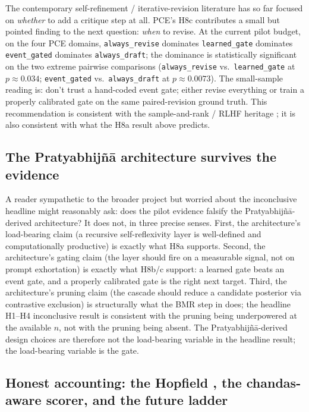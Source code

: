 The contemporary self-refinement / iterative-revision literature \citep{MadaanEtAl2023SelfRefineNeurIPS,ShinnEtAl2023Reflexion,BaiEtAl2022ConstitutionalAI} has so far focused on \emph{whether} to add a critique step at all. PCE's H8c contributes a small but pointed finding to the next question: \emph{when} to revise. At the current pilot budget, on the four PCE domains, \texttt{always\_revise} dominates \texttt{learned\_gate} dominates \texttt{event\_gated} dominates \texttt{always\_draft}; the dominance is statistically significant on the two extreme pairwise comparisons (\texttt{always\_revise} vs.\ \texttt{learned\_gate} at $p\approx 0.034$; \texttt{event\_gated} vs.\ \texttt{always\_draft} at $p\approx 0.0073$). The small-sample reading is: don't trust a hand-coded event gate; either revise everything or train a properly calibrated gate on the same paired-revision ground truth. This recommendation is consistent with the sample-and-rank / RLHF heritage \citep{StiennonEtAl2020LearningToSummarizeFromHumanFeedback}; it is also consistent with what the H8a result above predicts.

\subsection{The Pratyabhij\~n\=a architecture survives the evidence}

A reader sympathetic to the broader project but worried about the inconclusive headline might reasonably ask: does the pilot evidence falsify the Pratyabhij\~n\=a-derived architecture? It does not, in three precise senses. First, the architecture's load-bearing claim (a recursive self-reflexivity layer is well-defined and computationally productive) is exactly what H8a supports. Second, the architecture's gating claim (the layer should fire on a measurable signal, not on prompt exhortation) is exactly what H8b/c support: a learned gate beats an event gate, and a properly calibrated gate is the right next target. Third, the architecture's pruning claim (the cascade should reduce a candidate posterior via contrastive exclusion) is structurally what the BMR step in  does; the headline H1--H4 inconclusive result is consistent with the pruning being underpowered at the available $n$, not with the pruning being absent. The Pratyabhij\~n\=a-derived design choices are therefore not the load-bearing variable in the headline result; the load-bearing variable is the gate.

\subsection{Honest accounting: the Hopfield , the chandas-aware scorer, and the future ladder}

